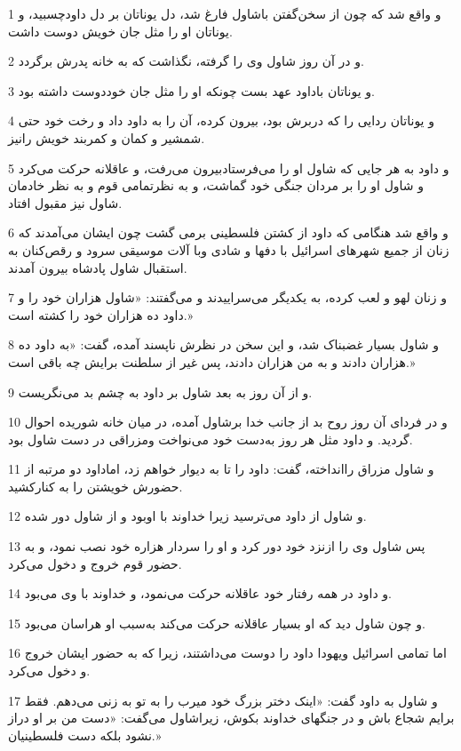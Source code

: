 \par 1 و واقع شد که چون از سخن‌گفتن باشاول فارغ شد، دل یوناتان بر دل داودچسبید، و یوناتان او را مثل جان خویش دوست داشت.
\par 2 و در آن روز شاول وی را گرفته، نگذاشت که به خانه پدرش برگردد.
\par 3 و یوناتان باداود عهد بست چونکه او را مثل جان خوددوست داشته بود.
\par 4 و یوناتان ردایی را که دربرش بود، بیرون کرده، آن را به داود داد و رخت خود حتی شمشیر و کمان و کمربند خویش رانیز.
\par 5 و داود به هر جایی که شاول او را می‌فرستادبیرون می‌رفت، و عاقلانه حرکت می‌کرد و شاول او را بر مردان جنگی خود گماشت، و به نظرتمامی قوم و به نظر خادمان شاول نیز مقبول افتاد.
\par 6 و واقع شد هنگامی که داود از کشتن فلسطینی برمی گشت چون ایشان می‌آمدند که زنان از جمیع شهرهای اسرائیل با دفها و شادی وبا آلات موسیقی سرود و رقص‌کنان به استقبال شاول پادشاه بیرون آمدند.
\par 7 و زنان لهو و لعب کرده، به یکدیگر می‌سراییدند و می‌گفتند: «شاول هزاران خود را و داود ده هزاران خود را کشته است.»
\par 8 و شاول بسیار غضبناک شد، و این سخن در نظرش ناپسند آمده، گفت: «به داود ده هزاران دادند و به من هزاران دادند، پس غیر از سلطنت برایش چه باقی است.»
\par 9 و از آن روز به بعد شاول بر داود به چشم بد می‌نگریست.
\par 10 و در فردای آن روز روح بد از جانب خدا برشاول آمده، در میان خانه شوریده احوال گردید. و داود مثل هر روز به‌دست خود می‌نواخت ومزراقی در دست شاول بود.
\par 11 و شاول مزراق راانداخته، گفت: داود را تا به دیوار خواهم زد، اماداود دو مرتبه از حضورش خویشتن را به کنارکشید.
\par 12 و شاول از داود می‌ترسید زیرا خداوند با اوبود و از شاول دور شده.
\par 13 پس شاول وی را ازنزد خود دور کرد و او را سردار هزاره خود نصب نمود، و به حضور قوم خروج و دخول می‌کرد.
\par 14 و داود در همه رفتار خود عاقلانه حرکت می‌نمود، و خداوند با وی می‌بود.
\par 15 و چون شاول دید که او بسیار عاقلانه حرکت می‌کند به‌سبب او هراسان می‌بود.
\par 16 اما تمامی اسرائیل ویهودا داود را دوست می‌داشتند، زیرا که به حضور ایشان خروج و دخول می‌کرد.
\par 17 و شاول به داود گفت: «اینک دختر بزرگ خود میرب را به تو به زنی می‌دهم. فقط برایم شجاع باش و در جنگهای خداوند بکوش، زیراشاول می‌گفت: «دست من بر او دراز نشود بلکه دست فلسطینیان.»
